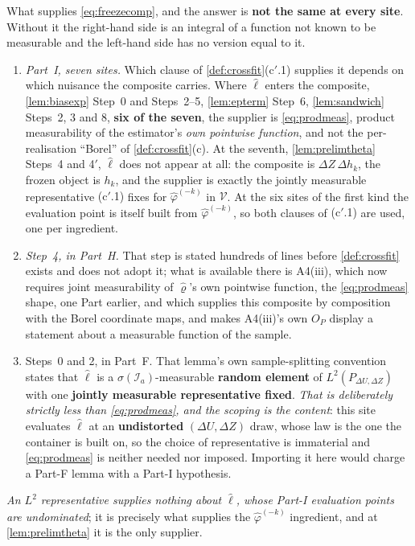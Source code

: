 \begin{remark}
What supplies \eqref{eq:freezecomp}, and the answer is \textbf{not the same at every site}. Without
it the right-hand side is an integral of a function not known to be measurable and the left-hand side has
no version equal to it.
\begin{enumerate}
\item[(a)] \emph{Part~I, seven sites.} Which clause of \cref{def:crossfit}\textup{(c$'$.1)} supplies it
depends on which nuisance the composite carries. Where $\hat\ell$ enters the composite, 
\cref{lem:biasexp} Step~0 and Steps~2--5, \cref{lem:epterm} Step~6, \cref{lem:sandwich} Steps~2, 3 and 8,
\textbf{six of the seven}, the supplier is \eqref{eq:prodmeas}, product measurability of the
estimator's \emph{own pointwise function}, and not the per-realisation ``Borel'' of
\cref{def:crossfit}\textup{(c)}. At the seventh, \cref{lem:prelimtheta} Steps~4 and 4$'$, $\hat\ell$ does
not appear at all: the composite is $\Delta Z\,\Delta h_k$, the frozen object is $h_k$, and the supplier is
exactly the jointly measurable representative \textup{(c$'$.1)} fixes for $\hat\varphi^{(-k)}$ in
$\mathcal V$. At the six sites of the first kind the evaluation point is itself built from
$\hat\varphi^{(-k)}$, so both clauses of \textup{(c$'$.1)} are used, one per ingredient.
\item[(b)] \emph{ Step~4, in Part~H.} That step is stated hundreds of lines before
\cref{def:crossfit} exists and does not adopt it; what is available there is A4(iii), which now requires
joint measurability of $\hat\varrho$'s own pointwise function, the \eqref{eq:prodmeas} shape, one Part
earlier, and which supplies this composite by composition with the Borel coordinate maps, and makes
A4(iii)'s own $O_P$ display a statement about a measurable function of the sample.
\item[(c)]  Steps~0 and 2, in Part~F. That lemma's own sample-splitting convention
states that $\hat\ell$ is a $\sigma(\mathcal I_a)$-measurable \textbf{random element} of
$L^{2}(P_{\Delta U,\Delta Z})$ with one \textbf{jointly measurable representative fixed}. \emph{That is
deliberately strictly less than \eqref{eq:prodmeas}, and the scoping is the content}: this site evaluates
$\hat\ell$ at an \textbf{undistorted} $(\Delta U,\Delta Z)$ draw, whose law is the one the container is
built on, so the choice of representative is immaterial and \eqref{eq:prodmeas} is neither needed nor
imposed. Importing it here would charge a Part-F lemma with a Part-I hypothesis.
\end{enumerate}
\emph{An $L^{2}$ representative supplies nothing about $\hat\ell$, whose Part-I evaluation points are
undominated}; it is precisely what supplies the $\hat\varphi^{(-k)}$ ingredient, and at
\cref{lem:prelimtheta} it is the only supplier.
\end{remark}

